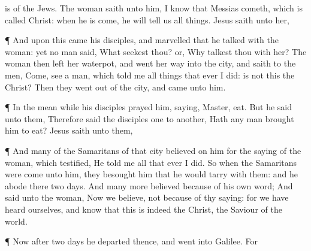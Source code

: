 {{{is
of
the Jews.}}
The
woman
saith unto
him, I
know
that
Messias
cometh, which is
called
Christ:
when
he is
come, he will
tell
us all
things.
Jesus
saith unto
her,
{}
\par }{\PP {}¶
And
upon
this
came
his
disciples,
and
marvelled
that he
talked
with the
woman:
yet no
man
said,
What seekest
thou?
or,
Why talkest
thou
with
her?
The
woman
then
left
her
waterpot,
and went her
way
into the
city,
and
saith to the
men,
Come,
see a
man,
which
told
me all
things that
ever I
did:
is
not
this the
Christ?
Then they went
out
of the
city,
and
came
unto
him.
\par }{\PP {}¶
In the mean
while his
disciples
prayed
him,
saying,
Master,
eat.
But he
said unto
them,
{}
Therefore
said the
disciples
one
to
another,
Hath any
man
brought
him
{} to
eat?
Jesus
saith unto
them,
{}
\par }{\PP {}¶
And
many
of the
Samaritans of
that
city
believed
on
him
for the
saying of the
woman, which
testified, He
told
me
all that
ever I
did.
So
when the
Samaritans were
come
unto
him, they
besought
him that he would
tarry
with
them:
and he
abode
there
two
days.
And
many
more
believed
because
of his
own
word;
And
said unto the
woman,
Now we
believe,
not
because
of
thy
saying:
for we have
heard
{}
ourselves,
and
know
that
this
is
indeed the
Christ, the
Saviour of the
world.
\par }{\PP {}¶
Now
after
two
days he
departed
thence,
and
went
into
Galilee.
For
}
